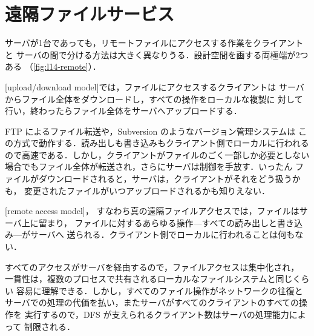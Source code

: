 \documentclass[../main.tex]{subfiles}
\begin{document}
\section{遠隔ファイルサービス}
\label{sec:l14-remote}

サーバが1台であっても，リモートファイルにアクセスする作業をクライアントと
サーバの間で分ける方法は大きく異なりうる．設計空間を画する両極端が2つある
（\cref{fig:l14-remote}）．

\begin{definition}
  [upload/download model]では，ファイルにアクセスするクライアントは
  サーバからファイル全体をダウンロードし，すべての操作をローカルな複製に
  対して行い，終わったらファイル全体をサーバへアップロードする．
\end{definition}

FTP によるファイル転送や，Subversion のようなバージョン管理システムは
この方式で動作する．読み出しも書き込みもクライアント側でローカルに行われる
ので高速である．しかし，クライアントがファイルのごく一部しか必要としない
場合でもファイル全体が転送され，さらにサーバは制御を手放す．いったん
ファイルがダウンロードされると，サーバは，クライアントがそれをどう扱うかも，
変更されたファイルがいつアップロードされるかも知りえない．

\begin{definition}[遠隔アクセスモデル]
  [remote access model]，
  すなわち真の遠隔ファイルアクセスでは，ファイルはサーバ上に留まり，
  ファイルに対するあらゆる操作---すべての読み出しと書き込み---がサーバへ
  送られる．クライアント側でローカルに行われることは何もない．
\end{definition}

すべてのアクセスがサーバを経由するので，ファイルアクセスは集中化され，
一貫性は，複数のプロセスで共有されるローカルなファイルシステムと同じくらい
容易に理解できる．しかし，すべてのファイル操作がネットワークの往復と
サーバでの処理の代価を払い，またサーバがすべてのクライアントのすべての操作を
実行するので，DFS が支えられるクライアント数はサーバの処理能力によって
制限される．
\end{document}
